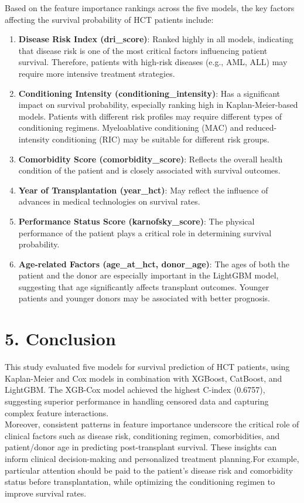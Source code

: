 \documentclass[11pt]{article}
\begin{document}
\noindent Based on the feature importance rankings across the five models, the key factors affecting the survival probability of HCT patients include:
\begin{enumerate}
    \item \textbf{Disease Risk Index (dri\_score)}: Ranked highly in all models, indicating that disease risk is one of the most critical factors influencing patient survival. Therefore, patients with high-risk diseases (e.g., AML, ALL) may require more intensive treatment strategies.
    
    \item \textbf{Conditioning Intensity (conditioning\_intensity)}: Has a significant impact on survival probability, especially ranking high in Kaplan-Meier-based models. Patients with different risk profiles may require different types of conditioning regimens. Myeloablative conditioning (MAC) and reduced-intensity conditioning (RIC) may be suitable for different risk groups.
    
    \item \textbf{Comorbidity Score (comorbidity\_score)}: Reflects the overall health condition of the patient and is closely associated with survival outcomes.
    
    \item \textbf{Year of Transplantation (year\_hct)}: May reflect the influence of advances in medical technologies on survival rates.
    
    \item \textbf{Performance Status Score (karnofsky\_score)}: The physical performance of the patient plays a critical role in determining survival probability.
    
    \item \textbf{Age-related Factors (age\_at\_hct, donor\_age)}: The ages of both the patient and the donor are especially important in the LightGBM model, suggesting that age significantly affects transplant outcomes. Younger patients and younger donors may be associated with better prognosis.
\end{enumerate}

\section*{5. Conclusion}
This study evaluated five models for survival prediction of HCT patients, using Kaplan-Meier and Cox models in combination with XGBoost, CatBoost, and LightGBM. The XGB-Cox model achieved the highest C-index (0.6757), suggesting superior performance in handling censored data and capturing complex feature interactions.\\


\noindent Moreover, consistent patterns in feature importance underscore the critical role of clinical factors such as disease risk, conditioning regimen, comorbidities, and patient/donor age in predicting post-transplant survival. These insights can inform clinical decision-making and personalized treatment planning.For example, particular attention should be paid to the patient's disease risk and comorbidity status before transplantation, while optimizing the conditioning regimen to improve survival rates.
\end{document}
